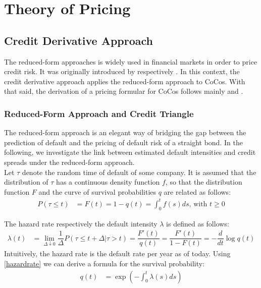 \chapter{Theory of Pricing}

\section{Credit Derivative Approach}

The reduced-form approaches is widely used in financial markets in order to price credit risk. It was originally introduced by \citet{jarrow1995pricing} respectively \citet{duffie1999modeling}. In this context, the credit derivative approach applies the reduced-form approach to CoCos. With that said, the derivation of a pricing formular for CoCos follows mainly \citet{lando2009credit} and \citet{de2011pricing}. 

\subsection{Reduced-Form Approach and Credit Triangle}

The reduced-form approach is an elegant way of bridging the gap between the prediction of default and the pricing of default risk of a straight bond. In the following, we investigate the link between estimated default intensities and credit spreads under the reduced-form approach. \citep{lando2009credit}\\

Let $\tau$ denote the random time of default of some company. It is assumed that the distribution of $\tau$ has a continuous density function $f$, so that the distribution function $F$ and the curve of survival probabilities $q$ are related as follows:  
\begin{align}
P(\tau \leq t) &= F(t) = 1 - q(t) = \int_0^t f(s) ds \text{, with } t \geq 0
\end{align}

The hazard rate respectively the default intensity $\lambda$ is defined as follows:
\begin{align} \label{hazardrate}
\lambda(t) &= \lim_{\Delta \downarrow 0} \dfrac{1}{\Delta} P(\tau \leq t + \Delta | \tau > t) = \dfrac{F'(t)}{q(t)} = \dfrac{F'(t)}{1 - F(t)} = - \dfrac{d}{dt} \log q(t)
\end{align}
Intuitively, the hazard rate is the default rate per year as of today. Using \ref{hazardrate} we can derive a formula for the survival probability:
\begin{align}
q(t) &= \exp \left(- \int_0^t \lambda (s) ds \right)
\end{align}

